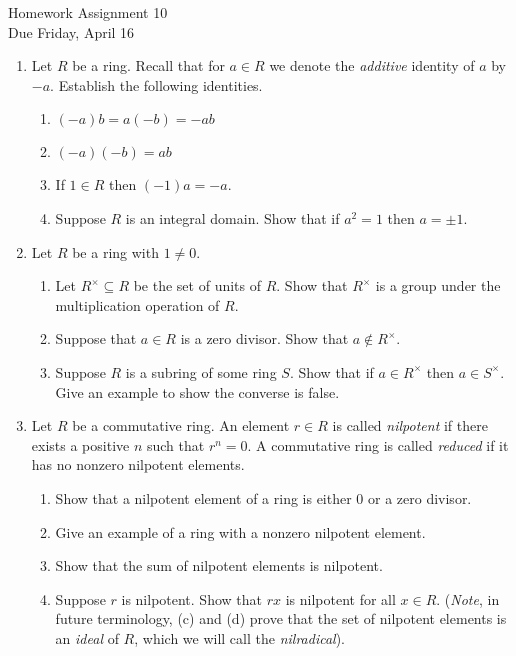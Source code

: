 \documentclass[11pt]{article}
\begin{document}
\begin{center}
  \Large {Homework Assignment 10}\\
  \small {Due Friday, April 16}
\end{center}
\begin{enumerate}
  \item{
  Let $R$ be a ring.  Recall that for $a\in R$ we denote the \textit{additive} identity of $a$ by $-a$.  Establish the following identities.
  \begin{enumerate}
    \item{$(-a)b = a(-b) = -ab$}
    \item{$(-a)(-b) = ab$}
    \item{If $1\in R$ then $(-1)a = -a$.}
    \item{Suppose $R$ is an integral domain.  Show that if $a^2=1$ then $a=\pm1$.}
  \end{enumerate}
  }
  \item{
  Let $R$ be a ring with $1\not=0$.
  \begin{enumerate}
    \item{
    Let $R^\times\subseteq R$ be the set of units of $R$.  Show that $R^\times$ is a group under the multiplication operation of $R$.
    }
    \item{
    Suppose that $a\in R$ is a zero divisor.  Show that $a\notin R^\times$.
    }
    \item{
    Suppose $R$ is a subring of some ring $S$.  Show that if $a\in R^\times$ then $a\in S^\times$.  Give an example to show the converse is false.
    }
  \end{enumerate}
  }
  \item{
  Let $R$ be a commutative ring.  An element $r\in R$ is called \textit{nilpotent} if there exists a positive $n$ such that $r^n=0$.  A commutative ring is called \textit{reduced} if it has no nonzero nilpotent elements.
  \begin{enumerate}
    \item{
    Show that a nilpotent element of a ring is either 0 or a zero divisor.
    }
    \item{
    Give an example of a ring with a nonzero nilpotent element.
    }
    \item{
    Show that the sum of nilpotent elements is nilpotent.
    }
    \item{
    Suppose $r$ is nilpotent.  Show that $rx$ is nilpotent for all $x\in R$.  (\textit{Note}, in future terminology, (c) and (d) prove that the set of nilpotent elements is an \textit{ideal} of $R$, which we will call the \textit{nilradical}).
}
\end{enumerate}}
\end{enumerate}
\end{document}
